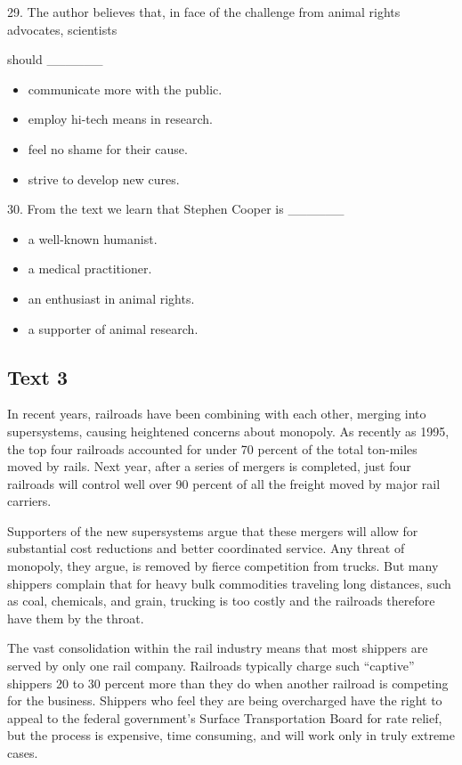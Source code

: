 \documentclass[UTF8,11pt]{ctexart}
\begin{document}
29. The author believes that, in face of the challenge from animal rights advocates, scientists


should \_\_\_\_\_\_


\begin{itemize}[leftmargin=2em,itemsep=.2em,topsep=.4em]\item[A.] communicate more with the public.
\item[B.] employ hi-tech means in research.
\item[C.] feel no shame for their cause.
\item[D.] strive to develop new cures.
\end{itemize}

30. From the text we learn that Stephen Cooper is \_\_\_\_\_\_


\begin{itemize}[leftmargin=2em,itemsep=.2em,topsep=.4em]\item[A.] a well-known humanist.
\item[B.] a medical practitioner.
\item[C.] an enthusiast in animal rights.
\item[D.] a supporter of animal research.
\end{itemize}

\subsection*{\textbf{Text 3}}


In recent years, railroads have been combining with each other, merging into supersystems, causing heightened concerns about monopoly. As recently as 1995, the top four railroads accounted for under 70 percent of the total ton-miles moved by rails. Next year, after a series of mergers is completed, just four railroads will control well over 90 percent of all the freight moved by major rail carriers.


Supporters of the new supersystems argue that these mergers will allow for substantial cost reductions and better coordinated service. Any threat of monopoly, they argue, is removed by fierce competition from trucks. But many shippers complain that for heavy bulk commodities traveling long distances, such as coal, chemicals, and grain, trucking is too costly and the railroads therefore have them by the throat.


The vast consolidation within the rail industry means that most shippers are served by only one rail company. Railroads typically charge such “captive” shippers 20 to 30 percent more than they do when another railroad is competing for the business. Shippers who feel they are being overcharged have the right to appeal to the federal government’s Surface Transportation Board for rate relief, but the process is expensive, time consuming, and will work only in truly extreme cases.
\end{document}
